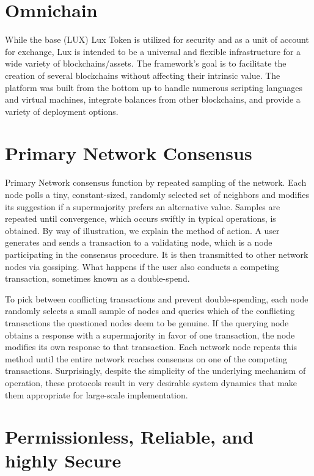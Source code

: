 \documentclass[11pt]{article}
\begin{document}
\section{Omnichain}

While the base (LUX) Lux Token is utilized for security and as a unit of account for exchange, Lux is intended to be a universal and flexible infrastructure for a wide variety of blockchains/assets. The framework's goal is to facilitate the creation of several blockchains without affecting their intrinsic value. The platform was built from the bottom up to handle numerous scripting languages and virtual machines, integrate balances from other blockchains, and provide a variety of deployment options.


\section{Primary Network Consensus}

Primary Network consensus function by repeated sampling of the network. Each node polls a tiny, constant-sized, randomly selected set of neighbors and modifies its suggestion if a supermajority prefers an alternative value. Samples are repeated until convergence, which occurs swiftly in typical operations, is obtained. By way of illustration, we explain the method of action. A user generates and sends a transaction to a validating node, which is a node participating in the consensus procedure. It is then transmitted to other network nodes via gossiping. What happens if the user also conducts a competing transaction, sometimes known as a double-spend.


To pick between conflicting transactions and prevent double-spending, each node randomly selects a small sample of nodes and queries which of the conflicting transactions the questioned nodes deem to be genuine. If the querying node obtains a response with a supermajority in favor of one transaction, the node modifies its own response to that transaction. Each network node repeats this method until the entire network reaches consensus on one of the competing transactions. Surprisingly, despite the simplicity of the underlying mechanism of operation, these protocols result in very desirable system dynamics that make them appropriate for large-scale implementation.


\section{Permissionless, Reliable, and highly Secure}
\end{document}
